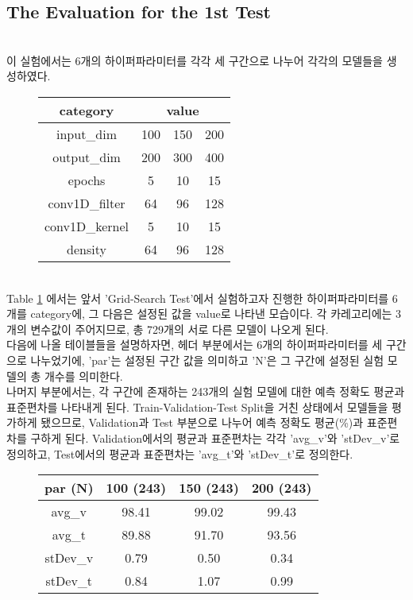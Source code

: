 \documentclass{jcse}
\begin{document}
\subsection{The Evaluation for the 1st Test}
\\이 실험에서는 6개의 하이퍼파라미터를 각각 세 구간으로 나누어 각각의 모델들을 생성하였다.
\begin{figure}[ht]
\begin{minipage}{\linewidth}
\centering
{}
\label{tab:HyperParameter}
\begin{tabular}{cccc}
\hline
category & \multicolumn{3}{c}{\textbf{value}} \\
\hline
input\_dim  & 100 & 150 & 200  \\
output\_dim  & 200 & 300 & 400  \\
epochs & 5 & 10 & 15 \\
conv1D\_filter & 64 & 96 & 128 \\
conv1D\_kernel & 5 & 10 & 15 \\
density & 64 & 96 & 128 \\
\hline
\end{tabular}
\end{minipage}
\end{figure}
\\Table \ref{tab:HyperParameter} 에서는 앞서 'Grid-Search Test'에서 실험하고자 진행한 하이퍼파라미터를 6개를 category에, 그 다음은 설정된 값을 value로 나타낸 모습이다. 각 카레고리에는 3개의 변수값이 주어지므로, 총 729개의 서로 다른 모델이 나오게 된다.
\\다음에 나올 테이블들을 설명하자면, 헤더 부분에서는 6개의 하이퍼파라미터를 세 구간으로 나누었기에, 'par'는 설정된 구간 값을 의미하고 'N'은 그 구간에 설정된 실험 모델의 총 개수를 의미한다. 
\\나머지 부분에서는, 각 구간에 존재하는 243개의 실험 모델에 대한 예측 정확도 평균과 표준편차를 나타내게 된다. Train-Validation-Test Split을 거친 상태에서 모델들을 평가하게 됐으므로, Validation과 Test 부분으로 나누어 예측 정확도 평균(\%)과 표준편차를 구하게 된다. Validation에서의 평균과 표준편차는 각각 'avg\_v'와 'stDev\_v'로 정의하고, Test에서의 평균과 표준편차는 'avg\_t'와 'stDev\_t'로 정의한다.
\\
\begin{figure}[ht]
\begin{minipage}{\linewidth}
\centering
{}
\label{tab:Input_dim}
\begin{tabular}{cccc}
\hline
par (N) & 100 (243) & 150 (243) & 200 (243) \\
\hline
avg\_v  & 98.41 & 99.02 & 99.43  \\
avg\_t  & 89.88 & 91.70 & 93.56  \\
stDev\_v & 0.79 & 0.50 & 0.34 \\
stDev\_t & 0.84 & 1.07 & 0.99 \\
\hline
\end{tabular}
\end{minipage}
\end{figure}
\end{document}
